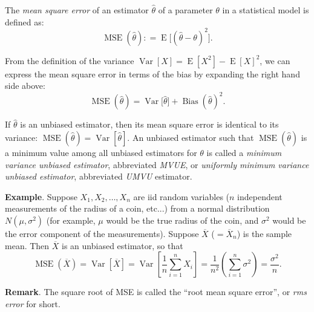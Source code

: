 \documentclass{article}
\begin{document}
The \emph{mean square error} of an estimator $\hat{\theta}$ of a
parameter $\theta$ in a statistical model is defined as:
$$\operatorname{MSE}(\hat{\theta})\colon=\operatorname{E}\big[(\hat{\theta}-\theta)^2\big].$$

From the definition of the variance
$\operatorname{Var}[X]=\operatorname{E}[X^2]-\operatorname{E}[X]^2$,
we can express the mean square error in terms of the bias by
expanding the right hand side above:
$$\operatorname{MSE}(\hat{\theta})=\operatorname{Var}\big[\hat{\theta}\big]+
\operatorname{Bias}(\hat{\theta})^2.$$

If $\hat{\theta}$ is an unbiased estimator, then its mean square
error is identical to its variance:
$\operatorname{MSE}(\hat{\theta})=\operatorname{Var}[\hat{\theta}]$.
An unbiased estimator such that $\operatorname{MSE}(\hat{\theta})$
is a minimum value among all unbiased estimators for $\theta$ is
called a \emph{minimum variance unbiased estimator}, abbreviated \emph{MVUE}, or \emph{uniformly minimum variance unbiased estimator}, abbreviated \emph{UMVU} estimator.

\textbf{Example}.  Suppose $X_1,X_2,\ldots,X_n$ are iid random
variables ($n$ independent measurements of the radius of a coin,
etc...) from a normal distribution $N(\mu,\sigma^2)$ (for example,
$\mu$ would be the true radius of the coin, and $\sigma^2$ would be
the error component of the measurements).  Suppose $\overline{X}$
($=\overline{X}_n$) is the sample mean.  Then $\overline{X}$ is an
unbiased estimator, so that
$$\operatorname{MSE}(\overline{X})=\operatorname{Var}\left[\overline{X}\right]=
\operatorname{Var}\left[\frac{1}{n}\sum_{i=1}^n
X_i\right]=\frac{1}{n^2}\left(\sum_{i=1}^n \sigma^2\right)=\frac{\sigma^2}{n}.$$

\textbf{Remark}.  The square root of MSE is called the ``root mean square error'', or \emph{rms error} for short.
\end{document}
